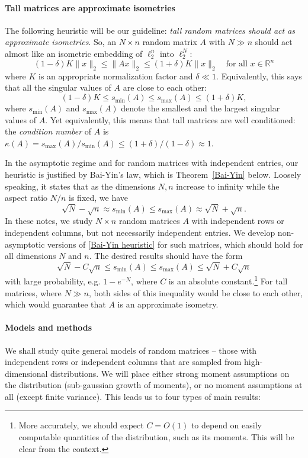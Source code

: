\documentclass[10pt, openany]{book}
\theoremstyle{remark}
\def \R {\mathbb{R}}
\def \d {\delta}
\def \smin {s_{\min}}
\def \smax {s_{\max}}
\begin{document}
\paragraph{Tall matrices are approximate isometries}
The following heuristic will be our guideline:
{\em tall random matrices should act as approximate isometries}.
So, an $N \times n$ random matrix $A$ with $N \gg n$ should act
almost like an isometric embedding of $\ell_2^n$ into $\ell_2^N$:
$$
(1-\d) K \|x\|_2 \le \|Ax\|_2 \le (1+\d) K \|x\|_2 \quad \text{for all } x \in \R^n
$$
where $K$ is an appropriate normalization factor and $\d \ll 1$. 
Equivalently, this says that all the singular values of $A$ are close to each other: 
$$
(1-\d)K \le \smin(A) \le \smax(A) \le (1+\d)K,
$$
where $\smin(A)$ and $\smax(A)$ denote the smallest and the largest singular values of $A$. 
Yet equivalently, this means that tall matrices are well conditioned: the {\em condition number}
of $A$ is $\kappa(A) = \smax(A)/\smin(A) \le (1+\d)/(1-\d) \approx 1$. 

In the asymptotic regime and for random matrices with independent entries, our heuristic
is justified by Bai-Yin's law, which is Theorem~\ref{Bai-Yin} below. 
Loosely speaking, it states that as the dimensions $N,n$ increase to infinity while the aspect ratio $N/n$ is fixed,
we have
\begin{equation}							\label{Bai-Yin heuristic}
 \sqrt{N} - \sqrt{n} \approx \smin(A) \le \smax(A) \approx \sqrt{N} + \sqrt{n}.
\end{equation}
In these notes, we study $N \times n$ random matrices $A$ with independent rows or independent columns,
but not necessarily independent entries. 
We develop non-asymptotic versions of \eqref{Bai-Yin heuristic} for such matrices,
which should hold for all dimensions $N$ and $n$. The desired results should have the form 
\begin{equation}							\label{heuristic}
\sqrt{N} - C \sqrt{n} \le \smin(A) \le \smax(A) \le \sqrt{N} + C \sqrt{n}
\end{equation}
with large probability, e.g. $1-e^{-N}$, where $C$ is an absolute constant.\footnote{More accurately,  
we should expect $C=O(1)$ to depend on easily computable quantities of the distribution, 
such as its moments. This will be clear from the context.} 
For tall matrices, where $N \gg n$, both sides of this inequality
would be close to each other, which would guarantee that $A$ is an approximate isometry.

\paragraph{Models and methods}
We shall study quite general models of random matrices -- those with independent rows
or independent columns that are sampled from high-dimensional distributions. We will place either  
strong moment assumptions on the distribution (sub-gaussian growth of moments), 
or no moment assumptions at all (except finite variance). This leads us
to four types of main results: 
\end{document}
